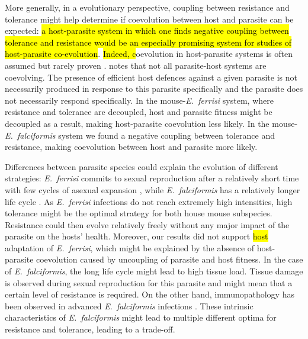 \documentclass[12pt]{article}
\begin{document}
More generally, in a evolutionary perspective, coupling between resistance and tolerance might help determine if coevolution between host and parasite can be expected: \hl{a host-parasite system in which one finds negative coupling between tolerance and resistance would be an especially promising system for studies of host-parasite co-evolution}. \hl{Indeed, c}oevolution in host-parasite systems is often assumed but rarely proven \citep{Woolhouse2002}. \cite{Janzen1980} notes that not all parasite-host systems are coevolving. The presence of efficient host defences against a given parasite is not necessarily produced in response to this parasite specifically and the parasite does not necessarily respond specifically. In the mouse-\textit{E.~ferrisi} system, where resistance and tolerance are decoupled, host and parasite fitness might be decoupled as a result, making host-parasite coevolution less likely. In the mouse-\textit{E.~falciformis} system we found a negative coupling between tolerance and resistance, making coevolution between host and parasite more likely. \par

Differences between parasite species could explain the evolution of different strategies: \textit{E.~ferrisi} commits to sexual reproduction after a relatively short time with few cycles of asexual expansion \citep{al-khlifeh_eimeria_2019, ankrom_life_1975}, while \textit{E.~falciformis} has a relatively longer life cycle \citep{al-khlifeh_eimeria_2019, haberkorn_entwicklung_1970}. As \textit{E.~ferrisi }infections do not reach extremely high intensities, high tolerance might be the optimal strategy for both house mouse subspecies. Resistance could then evolve relatively freely without any major impact of the parasite on the hosts’ health. Moreover, our results did not support \hl{host} adaptation of \textit{E.~ferrisi}, which might be explained by the absence of host-parasite coevolution caused by uncoupling of parasite and host fitness. In the case of \textit{E.~falciformis}, the long life cycle might lead to high tissue load. Tissue damage is observed during sexual reproduction for this parasite \citep{ehret_dual_2017} and might mean that a certain level of resistance is required. On the other hand, immunopathology has been observed in advanced \textit{E.~falciformis} infections \citep{stange_il-22_2012}. These intrinsic characteristics of \textit{E.~falciformis} might lead to multiple different optima for resistance and tolerance, leading to a trade-off.\par
\end{document}
